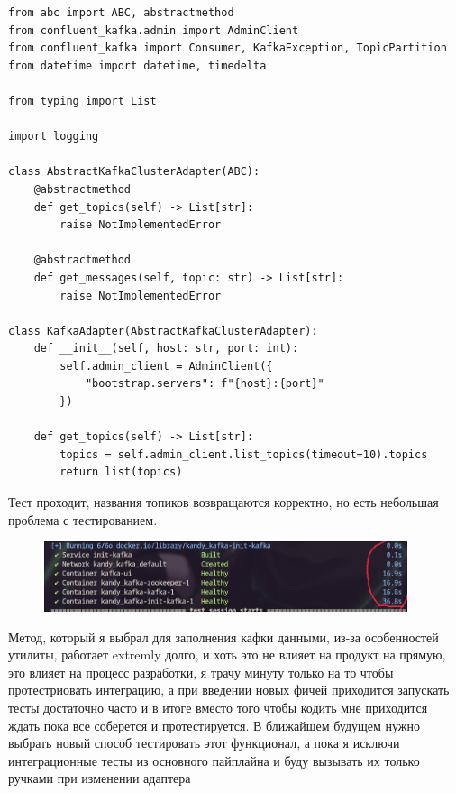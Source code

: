 \documentclass[10pt , a4paper]{report}
\newenvironment{code}{\captionsetup{type=listing}}{}
\begin{document}
\newpage
\begin{code}
  \begin{verbatim}
from abc import ABC, abstractmethod
from confluent_kafka.admin import AdminClient
from confluent_kafka import Consumer, KafkaException, TopicPartition
from datetime import datetime, timedelta

from typing import List

import logging 

class AbstractKafkaClusterAdapter(ABC):
    @abstractmethod
    def get_topics(self) -> List[str]:
        raise NotImplementedError

    @abstractmethod
    def get_messages(self, topic: str) -> List[str]:
        raise NotImplementedError

class KafkaAdapter(AbstractKafkaClusterAdapter):
    def __init__(self, host: str, port: int):
        self.admin_client = AdminClient({
            "bootstrap.servers": f"{host}:{port}"
        })
    
    def get_topics(self) -> List[str]:
        topics = self.admin_client.list_topics(timeout=10).topics
        return list(topics)
  \end{verbatim}
\end{code}

Тест проходит, названия топиков возвращаются корректно, но есть небольшая проблема с тестированием. 

\begin{figure}[htbp]
  \begin{center}
    \includegraphics[width=0.95\textwidth]{imgs/TestingTimings.png}
  \end{center}
  \caption{}\label{fig:}
\end{figure}

Метод, который я выбрал для заполнения кафки данными, из-за особенностей утилиты, работает extremly долго, и хоть это не влияет на продукт на прямую, это влияет на процесс разработки, я трачу минуту только на то чтобы протестриовать интеграцию, а при введении новых фичей приходится запускать тесты достаточно часто и в итоге вместо того чтобы кодить мне приходится ждать пока все соберется и протестируется. В ближайшем будущем нужно выбрать новый способ тестировать этот функционал, а пока я исключи интеграционные тесты из основного пайплайна и буду вызывать их только ручками при изменении адаптера
\end{document}
